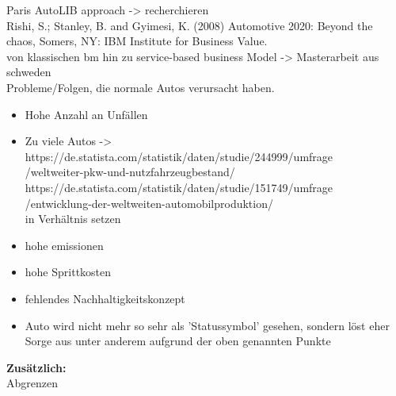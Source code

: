 Paris AutoLIB approach -> recherchieren\\
Rishi, S.; Stanley, B. and Gyimesi, K. (2008) Automotive 2020: Beyond the
chaos, Somers, NY: IBM Institute for Business Value.\\
von klassischen bm hin zu service-based business Model -> Masterarbeit aus schweden\\
Probleme/Folgen, die normale Autos verursacht haben.\cite{b19}
\begin{itemize}
	\item Hohe Anzahl an Unfällen
	\item Zu viele Autos ->\\
	https://de.statista.com/statistik/daten/studie/244999/umfrage\\/weltweiter-pkw-und-nutzfahrzeugbestand/\\
	https://de.statista.com/statistik/daten/studie/151749/umfrage\\/entwicklung-der-weltweiten-automobilproduktion/\\
	in Verhältnis setzen
	\item hohe emissionen
	\item hohe Sprittkosten
	\item fehlendes Nachhaltigkeitskonzept
	\item Auto wird nicht mehr so sehr als 'Statussymbol' gesehen, sondern löst eher Sorge aus unter anderem aufgrund der oben genannten Punkte
\end{itemize}
\textbf{Zusätzlich:}\\
Abgrenzen\\